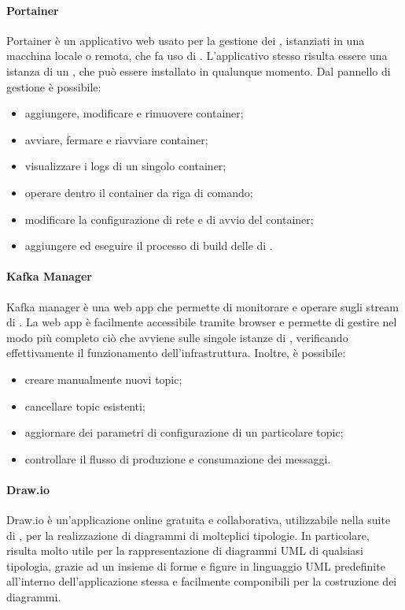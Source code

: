 				\paragraph{Portainer}
					Portainer è un applicativo web usato per la gestione dei , istanziati in una macchina locale o remota, che fa uso di .
					\newline
					L'applicativo stesso risulta essere una istanza di un , che può essere installato in qualunque momento. Dal pannello di gestione è possibile:
					\begin{itemize}
						\item aggiungere, modificare e rimuovere container;
						\item avviare, fermare e riavviare container;
						\item visualizzare i logs di un singolo container;
						\item operare dentro il container da riga di comando;
						\item modificare la configurazione di rete e di avvio del container;
						\item aggiungere ed eseguire il processo di build delle  di .
					\end{itemize}

				\paragraph{Kafka Manager}
					Kafka manager è una web app che permette di monitorare e operare sugli stream di .
					\newline
					La web app è facilmente accessibile tramite browser e permette di gestire nel modo più completo ciò che avviene sulle singole istanze di , verificando effettivamente il funzionamento dell'infrastruttura. Inoltre, è possibile:
					\begin{itemize}
					 	\item creare manualmente nuovi topic;
					 	\item cancellare topic esistenti;
					 	\item aggiornare dei parametri di configurazione di un particolare topic;
					 	\item controllare il flusso di produzione e consumazione dei messaggi.
					 \end{itemize}

				\paragraph{Draw.io}
					Draw.io è un'applicazione online gratuita e collaborativa, utilizzabile nella suite di , per la realizzazione di diagrammi di molteplici tipologie.
					\newline
					In particolare, risulta molto utile per la rappresentazione di diagrammi UML di qualsiasi tipologia, grazie ad un insieme di forme e figure in linguaggio UML predefinite all'interno dell'applicazione stessa e facilmente componibili per la costruzione dei diagrammi.

